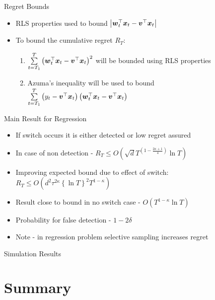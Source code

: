 \documentclass{beamer}
\begin{document}
\begin{frame}{Regret Bounds}
\begin{itemize}
\item RLS properties used to bound $\left\vert{{\boldsymbol{w}}}^{\top}_{t}{\boldsymbol{x}}_{t}-{{\boldsymbol{v}}}^{\top}{\boldsymbol{x}}_{t}\right\vert$\newline
\item To bound the cumulative regret $R_T$:\newline
\begin{enumerate}
\item $\sum\limits_{t=T_1}^{T}\left({{\boldsymbol{w}}}^{\top}_{t}{\boldsymbol{x}}_{t}-{{\boldsymbol{v}}}^{\top}{\boldsymbol{x}}_{t}\right)^2$ will be bounded using RLS properties\newline  
\item Azuma's inequality will be used to bound $\sum\limits_{t=T_1}^{T}\left(y_t-{{\boldsymbol{v}}}^{\top}{\boldsymbol{x}}_{t}\right)\left({{\boldsymbol{w}}}^{\top}_{t}{\boldsymbol{x}}_{t}-{{\boldsymbol{v}}}^{\top}{\boldsymbol{x}}_{t}\right)$
\end{enumerate}
\end{itemize}
\end{frame}

\begin{frame}{Main Result for Regression}
\begin{itemize}
\item If switch occurs it is either detected or low regret assured\newline
\item In case of non detection - $R_T\leq O\left(\sqrt{d}T^{\left(1-\frac{2\kappa+1}{4}\right)}\ln{T}\right)$\newline
\item Improving expected bound due to effect of switch: $R_T\leq O\left(d^2\tau^{2\kappa}\left\{\ln{T}\right\}^2T^{1-\kappa}\right)$\newline
\item Result close to bound in no switch case - $O\left(T^{1-\kappa}\ln{T}\right)$\newline
\item Probability for false detection - $1-2\delta$\newline
\item Note - in regression problem selective sampling increases regret
\end{itemize}
\end{frame}

\begin{frame}{Simulation Results}

\end{frame}

\section{Summary}
\end{document}
